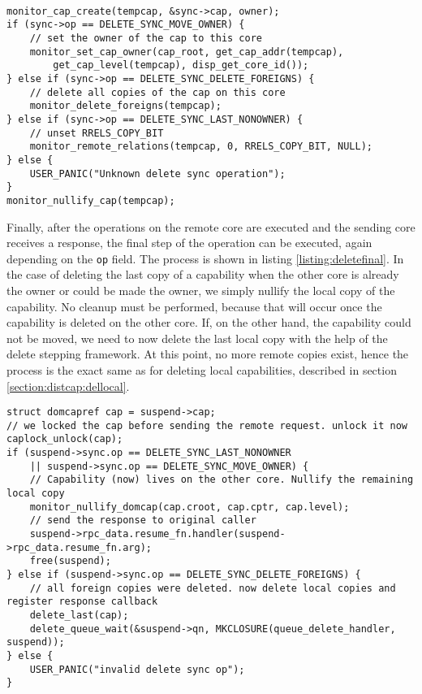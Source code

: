 \begin{lstlisting}[caption={Case distinction for delete synchronization operation},label={listing:deletesyncremote}]

monitor_cap_create(tempcap, &sync->cap, owner);
if (sync->op == DELETE_SYNC_MOVE_OWNER) {
    // set the owner of the cap to this core
    monitor_set_cap_owner(cap_root, get_cap_addr(tempcap), 
        get_cap_level(tempcap), disp_get_core_id());
} else if (sync->op == DELETE_SYNC_DELETE_FOREIGNS) {
    // delete all copies of the cap on this core
    monitor_delete_foreigns(tempcap);
} else if (sync->op == DELETE_SYNC_LAST_NONOWNER) {
    // unset RRELS_COPY_BIT
    monitor_remote_relations(tempcap, 0, RRELS_COPY_BIT, NULL);
} else {
    USER_PANIC("Unknown delete sync operation");
}
monitor_nullify_cap(tempcap);
\end{lstlisting}

Finally, after the operations on the remote core are executed and the sending core receives a response, the final step of the operation can be executed, again depending on the \texttt{op} field. The process is shown in listing \ref{listing:deletefinal}. In the case of deleting the last copy of a capability when the other core is already the owner or could be made the owner, we simply nullify the local copy of the capability. No cleanup must be performed, because that will occur once the capability is deleted on the other core. If, on the other hand, the capability could not be moved, we need to now delete the last local copy with the help of the delete stepping framework. At this point, no more remote copies exist, hence the process is the exact same as for deleting local capabilities, described in section \ref{section:distcap:dellocal}.

\begin{lstlisting}[caption={Final step of synchronized delete},label={listing:deletefinal}]
struct domcapref cap = suspend->cap;
// we locked the cap before sending the remote request. unlock it now
caplock_unlock(cap);
if (suspend->sync.op == DELETE_SYNC_LAST_NONOWNER 
    || suspend->sync.op == DELETE_SYNC_MOVE_OWNER) {
    // Capability (now) lives on the other core. Nullify the remaining local copy
    monitor_nullify_domcap(cap.croot, cap.cptr, cap.level);
    // send the response to original caller
    suspend->rpc_data.resume_fn.handler(suspend->rpc_data.resume_fn.arg);
    free(suspend);
} else if (suspend->sync.op == DELETE_SYNC_DELETE_FOREIGNS) {
    // all foreign copies were deleted. now delete local copies and register response callback
    delete_last(cap);
    delete_queue_wait(&suspend->qn, MKCLOSURE(queue_delete_handler, suspend));
} else {
    USER_PANIC("invalid delete sync op");
}
\end{lstlisting}

